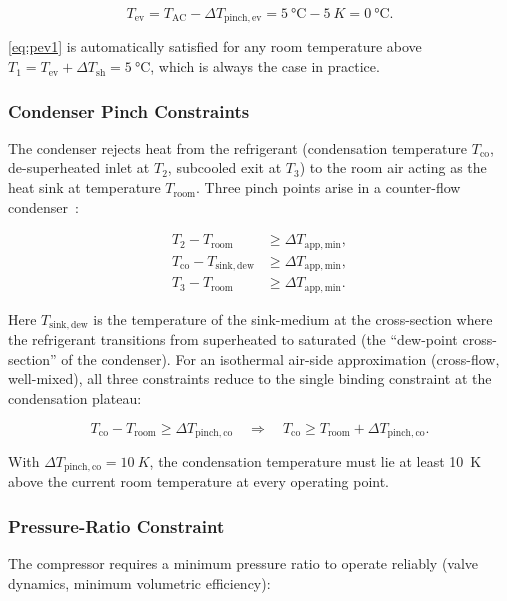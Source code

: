 \documentclass[12pt, a4paper]{article}
\newcommand{\Tco}{T_{\mathrm{co}}}
\newcommand{\Tev}{T_{\mathrm{ev}}}
\newcommand{\Troom}{T_{\mathrm{room}}}
\newcommand{\TAC}{T_{\mathrm{AC}}}
\newcommand{\dTpin}[1]{\Delta T_{\mathrm{pinch,#1}}}
\newcommand{\dTapp}{\Delta T_{\mathrm{app,min}}}
\newcommand{\dTsh}{\Delta T_{\mathrm{sh}}}
\begin{document}
\begin{equation}
  \boxed{\Tev = \TAC - \dTpin{ev} = \SI{5}{\degreeCelsius} - \SI{5}{K} = \SI{0}{\degreeCelsius}.}
  \label{eq:Tev_fixed}
\end{equation}

\eqref{eq:pev1} is automatically satisfied for any room temperature above
$T_1 = \Tev + \dTsh = \SI{5}{\degreeCelsius}$, which is always the case in practice.

\subsubsection{Condenser Pinch Constraints}

The condenser rejects heat from the refrigerant (condensation temperature $\Tco$,
de-superheated inlet at $T_2$, subcooled exit at $T_3$) to the room air acting as
the heat sink at temperature $\Troom$.
Three pinch points arise in a counter-flow condenser~\cite{coolprop}:

\begin{align}
  T_2 - \Troom
    &\geq \dTapp, \tag{P-co-1}\label{eq:pco1}\\[2pt]
  \Tco - T_{\mathrm{sink,dew}}
    &\geq \dTapp, \tag{P-co-2}\label{eq:pco2}\\[2pt]
  T_3 - \Troom
    &\geq \dTapp. \tag{P-co-3}\label{eq:pco3}
\end{align}

Here $T_{\mathrm{sink,dew}}$ is the temperature of the sink-medium at the cross-section
where the refrigerant transitions from superheated to saturated (the ``dew-point
cross-section'' of the condenser).
For an isothermal air-side approximation (cross-flow, well-mixed), all three constraints
reduce to the single binding constraint at the condensation plateau:

\begin{equation}
  \Tco - \Troom \geq \dTpin{co}
  \quad\Longrightarrow\quad
  \Tco \geq \Troom + \dTpin{co}.
  \tag{P-co}\label{eq:pco}
\end{equation}

With $\dTpin{co} = \SI{10}{K}$, the condensation temperature must lie at least
\SI{10}{K} above the current room temperature at every operating point.

\subsubsection{Pressure-Ratio Constraint}

The compressor requires a minimum pressure ratio to operate reliably (valve dynamics,
minimum volumetric efficiency):
\end{document}
